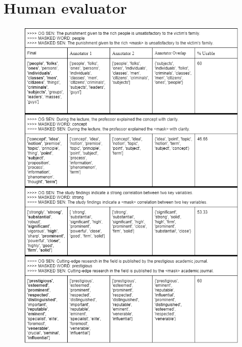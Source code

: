 \documentclass[12pt,oneside,openright,a4paper]{cpe-english-project}
\begin{document}
\section{Human evaluator}
\begin{figure}[!h]\centering
\includegraphics[width=15cm]{./img/Appendix/HumanEva.png}
\end{figure}

\newpage
\end{document}
